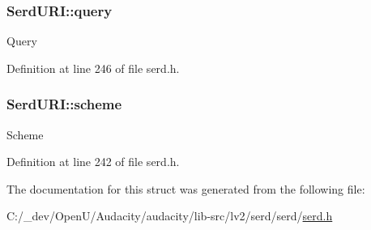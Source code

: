 \subsubsection[{\texorpdfstring{query}{query}}]{ Serd\+U\+R\+I\+::query}\hypertarget{struct_serd_u_r_i_a807d95462e4b97801f6a24115b2cdf46}{}\label{struct_serd_u_r_i_a807d95462e4b97801f6a24115b2cdf46}
Query 

Definition at line 246 of file serd.\+h.

\subsubsection[{\texorpdfstring{scheme}{scheme}}]{ Serd\+U\+R\+I\+::scheme}\hypertarget{struct_serd_u_r_i_a98a86ede5302ca626225d097f31c2cf1}{}\label{struct_serd_u_r_i_a98a86ede5302ca626225d097f31c2cf1}
Scheme 

Definition at line 242 of file serd.\+h.



The documentation for this struct was generated from the following file\+:\begin{DoxyCompactItemize}
\item 
C\+:/\+\_\+dev/\+Open\+U/\+Audacity/audacity/lib-\/src/lv2/serd/serd/\hyperlink{serd_8h}{serd.\+h}\end{DoxyCompactItemize}
